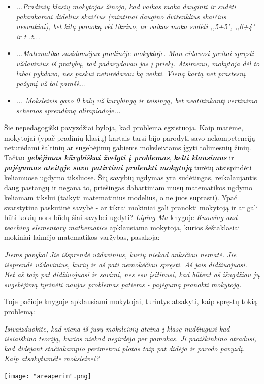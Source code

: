 \documentclass{article}
\begin{document}
\begin{itemize}
\item\textit{...Pradinių klasių mokytojas žinojo, kad vaikas moka dauginti ir sudėti pakankamai didelius skaičius (mintinai daugino dviženklius skaičius nesunkiai), bet kitą pamoką vėl tikrino, ar vaikas moka sudėti ,,5+5", ,,6+4" ir t .t...}
\item\textit{...Matematika susidomėjau pradinėje mokykloje. Man eidavosi greitai spręsti uždavinius iš pratybų, tad padarydavau jas į priekį. Atsimenu, mokytoja dėl to labai pykdavo, nes paskui neturėdavau ką veikti. Vieną kartą net prastesnį pažymį už tai parašė...} 
\item\textit{... Moksleivis gavo 0 balų už kūrybingą ir teisingą, bet neatitinkantį vertinimo schemos sprendimą olimpiadoje...}
\end{itemize}

Šie nepedagogiški pavyzdžiai byloja, kad problema egzistuoja. Kaip matėme, mokytojai (ypač pradinių klasių) kartais tarsi bijo parodyti savo nekompetenciją neturėdami šaltinių ar sugebėjimų gabiems moksleiviams įgyti tolimesnių žinių. Tačiau \textit{\textbf{gebėjimas kūrybiškai žvelgti į problemas}}, \textit{\textbf{kelti klausimus}} ir \textit{\textbf{pajėgumas ateityje savo patirtimi pralenkti mokytoją}} turėtų atsispindėti keliamuose ugdymo tiksluose. Šių savybių ugdymas yra sudėtingas, reikalaujantis daug pastangų ir negana to, priešingas dabartiniam mūsų matematikos ugdymo keliamam tikslui (taikyti matematinius modelius, o ne juos suprasti). Ypač svarstytina paskutinė savybė - ar tikrai mokiniai gali pranokti mokytoją ir ar gali būti kokių nors būdų šiai savybei ugdyti? \textit{Liping Ma} knygoje \textit{Knowing and teaching elementary mathematics} apklausiama mokytoja, kurios šeštaklasiai mokiniai laimėjo matematikos varžybas, pasakoja:

\textit{Jiems pavyko! Jie išsprendė uždavinius, kurių niekad anksčiau nematė. Jie išsprendė uždavinius, kurių ir aš pati nemokėčiau spręsti. Aš jais didžiuojuosi. Bet aš taip pat didžiuojuosi ir savimi, nes esu įsitinusi, kad būtent aš išugdžiau jų sugebėjimą tyrinėti naujas problemas patiems - pajėgumą pranokti mokytoją.}

Toje pačioje knygoje apklausiami mokytojai, turintys atsakyti, kaip spręstų tokią problemą:\newline

\begin{minipage}[b]{0.59\linewidth} \textit{Įsivaizduokite, kad viena iš jūsų moksleivių ateina į klasę nudžiugusi kad išsiaiškino teoriją, kurios niekad negirdėjo per pamokas. Ji paaiškinkino atradusi, kad didėjant stačiakampio perimetrui plotas taip pat didėja ir parodo pavyzdį. Kaip atsakytumėte moksleivei?}\end{minipage} \begin{minipage}[t]{0.41\linewidth} \texttt{[image: "areaperim".png]} \end{minipage}
\end{document}
